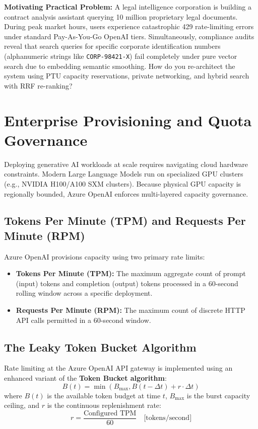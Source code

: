 \begin{chaptergoalsbox}
\textbf{Motivating Practical Problem:}
A legal intelligence corporation is building a contract analysis assistant querying 10 million proprietary legal documents. During peak market hours, users experience catastrophic 429 rate-limiting errors under standard Pay-As-You-Go OpenAI tiers. Simultaneously, compliance audits reveal that search queries for specific corporate identification numbers (alphanumeric strings like \texttt{CORP-98421-X}) fail completely under pure vector search due to embedding semantic smoothing. How do you re-architect the system using PTU capacity reservations, private networking, and hybrid search with RRF re-ranking?
\end{chaptergoalsbox}

\section{Enterprise Provisioning and Quota Governance}

Deploying generative AI workloads at scale requires navigating cloud hardware constraints. Modern Large Language Models run on specialized GPU clusters (e.g., NVIDIA H100/A100 SXM clusters). Because physical GPU capacity is regionally bounded, Azure OpenAI enforces multi-layered capacity governance.

\subsection{Tokens Per Minute (TPM) and Requests Per Minute (RPM)}
Azure OpenAI provisions capacity using two primary rate limits:
\begin{itemize}[leftmargin=12pt]
  \item \textbf{Tokens Per Minute (TPM):} The maximum aggregate count of prompt (input) tokens and completion (output) tokens processed in a 60-second rolling window across a specific deployment.
  \item \textbf{Requests Per Minute (RPM):} The maximum count of discrete HTTP API calls permitted in a 60-second window.
\end{itemize}

\subsection{The Leaky Token Bucket Algorithm}
Rate limiting at the Azure OpenAI API gateway is implemented using an enhanced variant of the \textbf{Token Bucket algorithm}:
\begin{equation}
B(t) = \min\left( B_{\max}, B(t-\Delta t) + r \cdot \Delta t \right)
\end{equation}
where $B(t)$ is the available token budget at time $t$, $B_{\max}$ is the burst capacity ceiling, and $r$ is the continuous replenishment rate:
\begin{equation}
r = \frac{\text{Configured TPM}}{60} \quad \text{[tokens/second]}
\end{equation}

